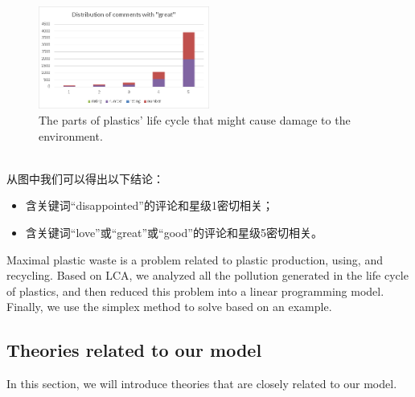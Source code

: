 \documentclass{mcmthesis}
\begin{document}
\begin{figure}[htb] %
	\centering %
	\includegraphics[width=0.5\textwidth]{figures/great.png} %
	\caption{The parts of plastics’ life cycle that might cause damage to the environment.} %
	\label{fig4} %
\end{figure}
\\
从图中我们可以得出以下结论：
\begin{itemize}
	\item 含关键词“disappointed”的评论和星级1密切相关；
	\item 含关键词“love”或“great”或“good”的评论和星级5密切相关。
\end{itemize}




Maximal plastic waste is a problem related to plastic production, using, and recycling. Based on LCA, we analyzed all the pollution generated in the life cycle of plastics, and then reduced this problem into a linear programming model. Finally, we use the simplex method to solve based on an example.

\subsection{Theories related to our model}

In this section, we will introduce theories that are closely related to our model.

\end{document}
